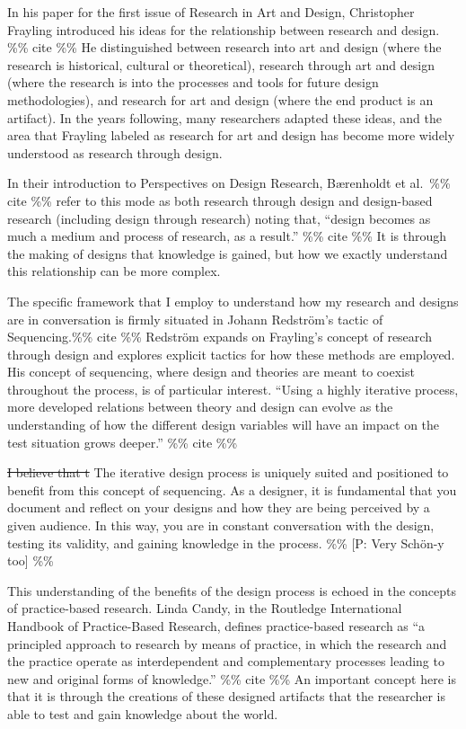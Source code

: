 \documentclass[
]{article}
\begin{document}
In his paper for the first issue of Research in Art and Design,
Christopher Frayling introduced his ideas for the relationship between
research and design. \%\% cite \%\% He distinguished between research
into art and design (where the research is historical, cultural or
theoretical), research through art and design (where the research is
into the processes and tools for future design methodologies), and
research for art and design (where the end product is an artifact). In
the years following, many researchers adapted these ideas, and the area
that Frayling labeled as research for art and design has become more
widely understood as research through design.

In their introduction to Perspectives on Design Research, Bærenholdt et
al.~\%\% cite \%\% refer to this mode as both research through design
and design-based research (including design through research) noting
that, ``design becomes as much a medium and process of research, as a
result.'' \%\% cite \%\% It is through the making of designs that
knowledge is gained, but how we exactly understand this relationship can
be more complex.

The specific framework that I employ to understand how my research and
designs are in conversation is firmly situated in Johann Redström's
tactic of Sequencing.\%\% cite \%\% Redström expands on Frayling's
concept of research through design and explores explicit tactics for how
these methods are employed. His concept of sequencing, where design and
theories are meant to coexist throughout the process, is of particular
interest. ``Using a highly iterative process, more developed relations
between theory and design can evolve as the understanding of how the
different design variables will have an impact on the test situation
grows deeper.'' \%\% cite \%\%

\st{I believe that t} The iterative design process is uniquely suited
and positioned to benefit from this concept of sequencing. As a
designer, it is fundamental that you document and reflect on your
designs and how they are being perceived by a given audience. In this
way, you are in constant conversation with the design, testing its
validity, and gaining knowledge in the process. \%\% {[}P: Very Schön-y
too{]} \%\%

This understanding of the benefits of the design process is echoed in
the concepts of practice-based research. Linda Candy, in the Routledge
International Handbook of Practice-Based Research, defines
practice-based research as ``a principled approach to research by means
of practice, in which the research and the practice operate as
interdependent and complementary processes leading to new and original
forms of knowledge.'' \%\% cite \%\% An important concept here is that
it is through the creations of these designed artifacts that the
researcher is able to test and gain knowledge about the world.
\end{document}
